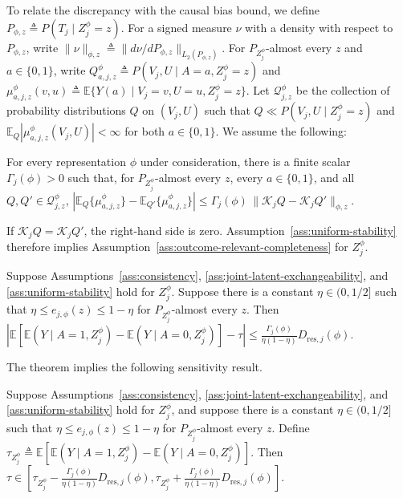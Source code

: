 To relate the discrepancy with the causal bias bound, we define
\(P_{\phi,z}\triangleq P(T_j\mid Z_j^\phi=z).\)
For a signed measure $\nu$ with a density with respect to $P_{\phi,z}$, write $\|\nu\|_{\phi,z}\triangleq\|d\nu/dP_{\phi,z}\|_{L_2(P_{\phi,z})}$.
For $P_{Z_j^\phi}$-almost every $z$ and $a\in\{0,1\}$, write
$Q_{a,j,z}^\phi\triangleq P(V_j,U\mid A=a,Z_j^\phi=z)$ and
$\mu_{a,j,z}^\phi(v,u)\triangleq\mathbb E\{Y(a)\mid V_j=v,U=u,Z_j^\phi=z\}$.
Let $\mathcal Q_{j,z}^\phi$ be the collection of probability distributions $Q$ on $(V_j,U)$ such that
$Q\ll P(V_j,U\mid Z_j^\phi=z)$ and
$\mathbb E_Q|\mu_{a,j,z}^\phi(V_j,U)|<\infty$ for both $a\in\{0,1\}$.
We assume the following:
\begin{assumption}
	\label{appdetail:ass:uniform-stability}
\normalfont
	For every representation $\phi$ under consideration,
	there is a finite scalar $\Gamma_j(\phi)>0$
	such that, for $P_{Z_j^\phi}$-almost every $z$, every $a\in\{0,1\}$, and all $Q,Q'\in\mathcal Q_{j,z}^{\phi}$,
	\(\left|\mathbb E_Q\{\mu_{a,j,z}^{\phi}\} - \mathbb E_{Q'}\{\mu_{a,j,z}^{\phi}\}\right| \le \Gamma_j(\phi) \,\|\mathcal K_jQ-\mathcal K_jQ'\|_{\phi,z}.\)
\end{assumption}

If $\mathcal K_jQ=\mathcal K_jQ'$, the right-hand side is zero. Assumption~\ref{ass:uniform-stability} therefore implies Assumption~\ref{ass:outcome-relevant-completeness} for $Z_j^\phi$.
\begin{theorem}
\label{appdetail:thm:approximate-proxy-bias-bound}
\normalfont
	Suppose Assumptions~\ref{ass:consistency}, \ref{ass:joint-latent-exchangeability}, and \ref{ass:uniform-stability} hold for $Z_j^\phi$.
	Suppose there is a constant $\eta\in(0,1/2]$ such that $\eta\le e_{j,\phi}(z)\le1-\eta$ for $P_{Z_j^\phi}$-almost every $z$. Then
	\(\left| \mathbb E\!\left[ \mathbb E(Y\mid A=1,Z_j^\phi) - \mathbb E(Y\mid A=0,Z_j^\phi) \right] -\tau \right| \le \frac{\Gamma_j(\phi)}{\eta(1-\eta)} D_{\mathrm{res},j}(\phi).\)
\end{theorem}

The theorem implies the following sensitivity result.
\begin{proposition}
\label{prop:population-sensitivity-region}
\normalfont
Suppose Assumptions~\ref{ass:consistency}, \ref{ass:joint-latent-exchangeability}, and \ref{ass:uniform-stability} hold for $Z_j^\phi$, and suppose there is a constant $\eta\in(0,1/2]$ such that $\eta\le e_{j,\phi}(z)\le1-\eta$ for $P_{Z_j^\phi}$-almost every $z$. Define
\(\tau_{Z_j^\phi} \triangleq \mathbb E\!\left[ \mathbb E(Y\mid A=1,Z_j^\phi) - \mathbb E(Y\mid A=0,Z_j^\phi) \right].\)
Then
\(\tau\in \left[ \tau_{Z_j^\phi}- \frac{\Gamma_j(\phi)}{\eta(1-\eta)}D_{\mathrm{res},j}(\phi), \tau_{Z_j^\phi}+ \frac{\Gamma_j(\phi)}{\eta(1-\eta)}D_{\mathrm{res},j}(\phi) \right].\)
\end{proposition}

